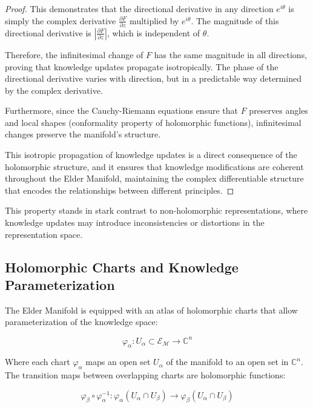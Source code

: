 \begin{proof}
This demonstrates that the directional derivative in any direction $e^{i\theta}$ is simply the complex derivative $\frac{\partial F}{\partial z}$ multiplied by $e^{i\theta}$. The magnitude of this directional derivative is $\left|\frac{\partial F}{\partial z}\right|$, which is independent of $\theta$.

Therefore, the infinitesimal change of $F$ has the same magnitude in all directions, proving that knowledge updates propagate isotropically. The phase of the directional derivative varies with direction, but in a predictable way determined by the complex derivative.

Furthermore, since the Cauchy-Riemann equations ensure that $F$ preserves angles and local shapes (conformality property of holomorphic functions), infinitesimal changes preserve the manifold's structure.

This isotropic propagation of knowledge updates is a direct consequence of the holomorphic structure, and it ensures that knowledge modifications are coherent throughout the Elder Manifold, maintaining the complex differentiable structure that encodes the relationships between different principles.
\end{proof}

This property stands in stark contrast to non-holomorphic representations, where knowledge updates may introduce inconsistencies or distortions in the representation space.

\subsection{Holomorphic Charts and Knowledge Parameterization}

The Elder Manifold is equipped with an atlas of holomorphic charts that allow parameterization of the knowledge space:

\begin{equation}
\varphi_{\alpha}: U_{\alpha} \subset \mathcal{E}_{\mathcal{M}} \rightarrow \mathbb{C}^n
\end{equation}

Where each chart $\varphi_{\alpha}$ maps an open set $U_{\alpha}$ of the manifold to an open set in $\mathbb{C}^n$. The transition maps between overlapping charts are holomorphic functions:

\begin{equation}
\varphi_{\beta} \circ \varphi_{\alpha}^{-1}: \varphi_{\alpha}(U_{\alpha} \cap U_{\beta}) \rightarrow \varphi_{\beta}(U_{\alpha} \cap U_{\beta})
\end{equation}

